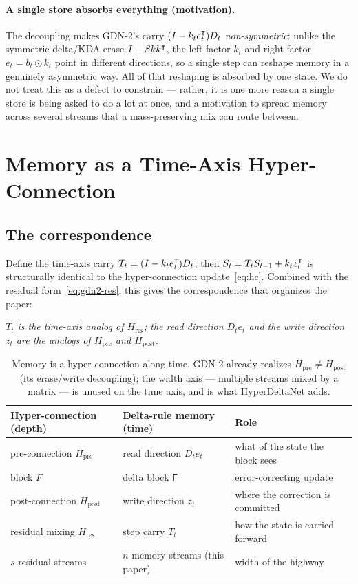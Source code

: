 \documentclass[11pt,letterpaper,logo]{yalearxiv}
\newcommand{\Tcarry}{T}                        %
\newcommand{\Hres}{H_{\mathrm{res}}}
\newcommand{\Hpre}{H_{\mathrm{pre}}}
\newcommand{\Hpost}{H_{\mathrm{post}}}
\newcommand{\Fdelta}{\mathsf{F}}               %
\begin{document}
\paragraph{A single store absorbs everything (motivation).} The decoupling makes
GDN-2's carry $(I - k_t e_t^{\intercal})D_t$ \emph{non-symmetric}: unlike the symmetric
delta/KDA erase $I - \beta k k^{\intercal}$, the left factor $k_t$ and right factor
$e_t = b_t\odot k_t$ point in different directions, so a single step can reshape
memory in a genuinely asymmetric way. All of that reshaping is absorbed by one
state. We do not treat this as a defect to constrain --- rather, it is one more
reason a single store is being asked to do a lot at once, and a motivation to
spread memory across several streams that a mass-preserving mix can route between.


\section{Memory as a Time-Axis Hyper-Connection}
\label{sec:view}

\subsection{The correspondence}
Define the time-axis carry $\Tcarry_t = (I - k_t e_t^{\tr}) D_t$; then
$S_t = \Tcarry_t S_{t-1} + k_t z_t^{\tr}$ is structurally identical to the
hyper-connection update~\eqref{eq:hc}. Combined with the residual
form~\eqref{eq:gdn2-res}, this gives the correspondence that organizes the paper:
\begin{center}
\emph{$\Tcarry_t$ is the time-axis analog of $\Hres$; the read direction $D_t e_t$
and the write direction $z_t$ are the analogs of $\Hpre$ and $\Hpost$.}
\end{center}

\begin{table}[t]
\centering
\small
\begin{tabular}{@{}lll@{}}
\toprule
Hyper-connection (depth) & Delta-rule memory (time) & Role \\
\midrule
pre-connection $\Hpre$   & read direction $D_t e_t$        & what of the state the block sees \\
block $F$                & delta block $\Fdelta$           & error-correcting update \\
post-connection $\Hpost$ & write direction $z_t$           & where the correction is committed \\
residual mixing $\Hres$  & step carry $\Tcarry_t$          & how the state is carried forward \\
$s$ residual streams     & $n$ memory streams (this paper) & width of the highway \\
\bottomrule
\end{tabular}
\caption{Memory is a hyper-connection along time. GDN-2 already realizes
$\Hpre\neq\Hpost$ (its erase/write decoupling); the width axis --- multiple
streams mixed by a matrix --- is unused on the time axis, and is what
HyperDeltaNet adds.}
\label{tab:halves}
\end{table}
\end{document}
